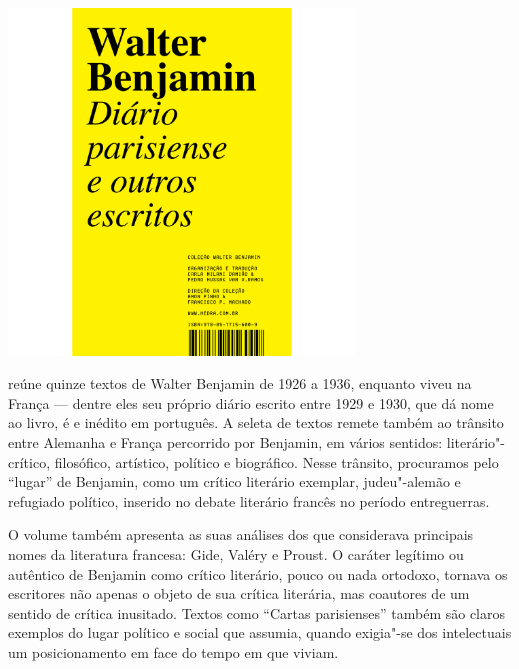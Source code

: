 \begin{center}
\hspace*{.5cm}\includegraphics[width=92mm]{./grid/benjamin2.jpg}
\end{center}

\hspace*{-7cm}\hrulefill\hspace*{-7cm}

\medskip

 reúne quinze textos de Walter Benjamin de 1926 a 1936, enquanto viveu na França --- dentre eles seu próprio diário escrito entre 1929 e 1930, que dá nome ao livro, é e inédito em português. A seleta de textos remete também ao trânsito entre Alemanha e França percorrido por Benjamin, em vários sentidos: literário"-crítico, filosófico, artístico, político e biográfico. Nesse trânsito, procuramos pelo “lugar” de Benjamin, como um crítico literário exemplar, judeu"-alemão e refugiado político, inserido no debate literário francês no período entreguerras.

O volume também apresenta as suas análises dos que considerava principais nomes da literatura francesa: Gide, Valéry e Proust. O caráter legítimo ou autêntico de Benjamin como crítico literário, pouco ou nada ortodoxo, tornava os escritores não apenas o objeto de sua crítica literária, mas coautores de um sentido de crítica inusitado. Textos como “Cartas parisienses” também são claros exemplos do lugar político e social que assumia, quando exigia"-se dos intelectuais um posicionamento em face do tempo em que viviam.


\vfill

\hspace*{-.4cm}\begin{minipage}[c]{.5\linewidth}
\small{
{}}
\end{minipage}

